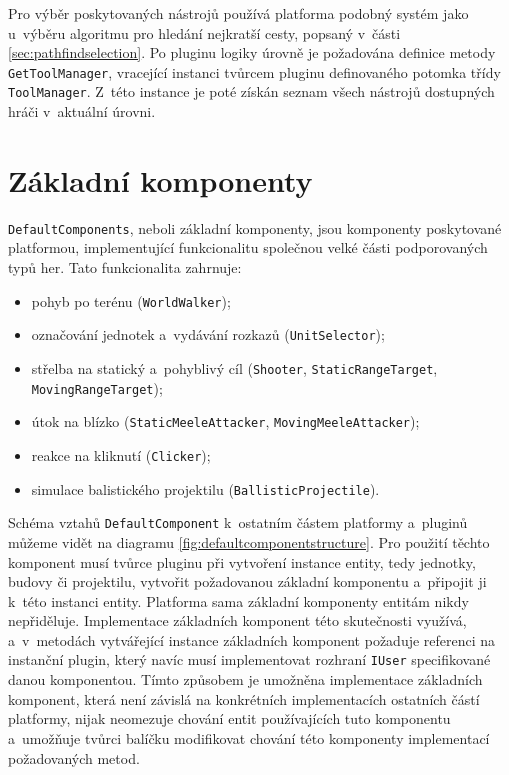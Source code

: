 Pro výběr poskytovaných nástrojů používá platforma podobný systém jako u~výběru algoritmu pro hledání nejkratší cesty, popsaný v~části \ref{sec:pathfindselection}. Po pluginu logiky úrovně je požadována definice metody \texttt{GetToolManager}, vracející instanci tvůrcem pluginu definovaného potomka třídy \texttt{ToolManager}. Z~této instance je poté získán seznam  všech nástrojů dostupných hráči v~aktuální úrovni.

\section{Základní komponenty}
\label{sec:defaultcomponents}
\texttt{DefaultComponents}, neboli základní komponenty, jsou komponenty poskytované platformou, implementující funkcionalitu společnou velké části podporovaných typů her. Tato funkcionalita zahrnuje:

\begin{itemize}
	\item pohyb po terénu (\texttt{WorldWalker});
	\item označování jednotek a~vydávání rozkazů (\texttt{UnitSelector});
	\item střelba na statický a~pohyblivý cíl (\texttt{Shooter}, \texttt{StaticRangeTarget},\\ \texttt{MovingRangeTarget});
	\item útok na blízko (\texttt{StaticMeeleAttacker}, \texttt{MovingMeeleAttacker});
	\item reakce na kliknutí (\texttt{Clicker});
	\item simulace balistického projektilu (\texttt{BallisticProjectile}).
\end{itemize}

Schéma vztahů \texttt{DefaultComponent} k~ostatním částem platformy a~pluginů můžeme vidět na diagramu \ref{fig:defaultcomponentstructure}. Pro použití těchto komponent musí tvůrce pluginu při vytvoření instance entity, tedy jednotky, budovy či projektilu, vytvořit požadovanou základní komponentu a~připojit ji k~této instanci entity. Platforma sama základní komponenty entitám nikdy nepřiděluje. Implementace základních komponent této skutečnosti využívá, a~v~metodách vytvářející instance základních komponent požaduje referenci na instanční plugin, který navíc musí implementovat rozhraní \texttt{IUser} specifikované danou komponentou. Tímto způsobem je umožněna implementace základních komponent, která není závislá na konkrétních implementacích ostatních částí platformy, nijak neomezuje chování entit používajících tuto komponentu a~umožňuje tvůrci balíčku modifikovat chování této komponenty implementací požadovaných metod. 

